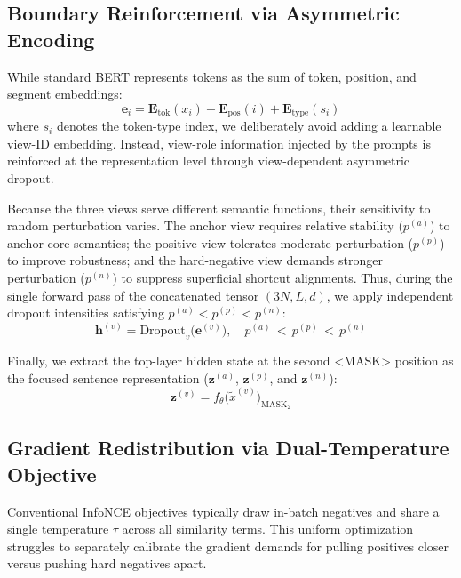 \documentclass[lettersize,journal]{IEEEtran}
\begin{document}
\subsection{Boundary Reinforcement via Asymmetric Encoding}
\label{subsec:encoding}

While standard BERT represents tokens as the sum of token, position, and segment embeddings:
\begin{equation}
\mathbf{e}_i = \mathbf{E}_{\mathrm{tok}}(x_i) + \mathbf{E}_{\mathrm{pos}}(i) + \mathbf{E}_{\mathrm{type}}(s_i)
\end{equation}
where $s_i$ denotes the token-type index, we deliberately avoid adding a learnable view-ID embedding. Instead, view-role information injected by the prompts is reinforced at the representation level through view-dependent asymmetric dropout.

Because the three views serve different semantic functions, their sensitivity to random perturbation varies. The anchor view requires relative stability ($p^{(a)}$) to anchor core semantics; the positive view tolerates moderate perturbation ($p^{(p)}$) to improve robustness; and the hard-negative view demands stronger perturbation ($p^{(n)}$) to suppress superficial shortcut alignments. Thus, during the single forward pass of the concatenated tensor $(3N, L, d)$, we apply independent dropout intensities satisfying $p^{(a)} < p^{(p)} < p^{(n)}$:
\begin{equation}
\mathbf{h}^{(v)} = \mathrm{Dropout}_v\bigl(\mathbf{e}^{(v)}\bigr), \quad p^{(a)} \,<\, p^{(p)} \,<\, p^{(n)}
\end{equation}

Finally, we extract the top-layer hidden state at the second <MASK> position as the focused sentence representation ($\mathbf{z}^{(a)}$, $\mathbf{z}^{(p)}$, and $\mathbf{z}^{(n)}$):
\begin{equation}
\mathbf{z}^{(v)} = f_\theta\bigl(\tilde{x}^{(v)}\bigr)_{\text{MASK}_2}
\end{equation}

\subsection{Gradient Redistribution via Dual-Temperature Objective}
\label{subsec:dt-loss}

Conventional InfoNCE objectives typically draw in-batch negatives and share a single temperature $\tau$ across all similarity terms. This uniform optimization struggles to separately calibrate the gradient demands for pulling positives closer versus pushing hard negatives apart.
\end{document}

